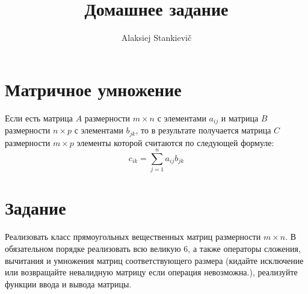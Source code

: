 \documentclass[12pt]{article}
\author{Alaksiej Stankievič}
\title{Домашнее задание}
\begin{document}

\section*{Матричное умножение}
Если есть матрица $A$ размерности $m\times{}n$ с элементами $a_{ij}$ и матрица $B$ размерности $n\times{}p$ с 
элементами $b_{jk}$, то в результате получается матрица $C$ размерности $m\times{}p$ элементы которой считаются по 
следующей формуле:
\begin{equation}
 c_{ik}=\sum_{j=1}^{n}a_{ij}b_{jk}
\end{equation}


\section*{Задание}

Реализовать класс прямоугольных вещественных матриц размерности $m\times{}n$. В обязательном порядке реализовать всю 
великую 6, а также операторы сложения, вычитания и умножения матриц соответствующего размера (кидайте исключение или 
возвращайте невалидную матрицу если операция невозможна.), реализуйте функции ввода и вывода матрицы.
\end{document}
